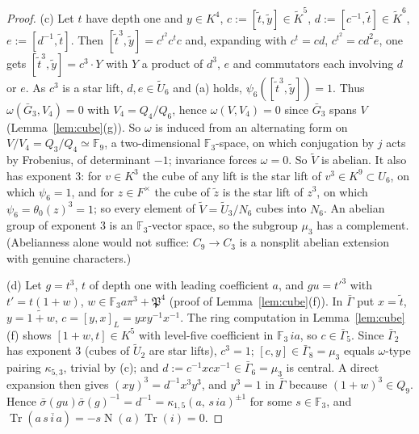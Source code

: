 \documentclass[11pt]{article}
\newcommand{\Fq}{\mathbb F}
\newcommand{\Nm}{\operatorname N}
\newcommand{\Tr}{\operatorname{Tr}}
\newcommand{\tU}{\widetilde U}
\newcommand{\tV}{\widetilde V}
\newcommand{\Pfr}{\mathfrak P}
\theoremstyle{plain}
\theoremstyle{definition}
\begin{document}
\begin{proof}
(c) Let $t$ have depth one and $y\in K^4$, $c:=[\tilde t,\tilde y]\in\tilde K^5$,
$d:=[c^{-1},\tilde t]\in\tilde K^6$, $e:=[d^{-1},\tilde t]$.  Then
$[\tilde t^3,\tilde y]=c^{t^2}c^{t}c$ and, expanding with $c^t=cd$,
$c^{t^2}=cd^2e$, one gets $[\tilde t^3,\tilde y]=c^3\cdot Y$ with $Y$ a
product of $d^3$, $e$ and commutators each involving $d$ or $e$.  As
$c^3$ is a star lift, $d,e\in\tU_6$ and (a) holds, $\psi_6([\tilde t^3,\tilde y])=1$.
Thus $\omega(\bar G_3,V_4)=0$ with $V_4=Q_4/Q_6$, hence $\omega(V,V_4)=0$
since $\bar G_3$ spans $V$ (Lemma~\ref{lem:cube}(g)).  So $\omega$ is
induced from an alternating form on $V/V_4=Q_3/Q_4\simeq\Fq_9$, a
two-dimensional $\Fq_3$-space, on which conjugation by $j$ acts by
Frobenius, of determinant $-1$; invariance forces $\omega=0$.  So $\tV$
is abelian.  It also has exponent $3$: for $v\in K^3$ the cube of any
lift is the star lift of $v^3\in K^9\subset U_6$, on which $\psi_6=1$,
and for $z\in F^\times$ the cube of $\tilde z$ is the star lift of
$z^3$, on which $\psi_6=\theta_0(z)^3=1$; so every element of
$\tV=\tU_3/N_6$ cubes into $N_6$.  An abelian group of exponent $3$ is
an $\Fq_3$-vector space, so the subgroup $\mu_3$ has a complement.
(Abelianness alone would not suffice: $C_9\to C_3$ is a nonsplit abelian
extension with genuine characters.)

(d) Let $g=t^3$, $t$ of depth one with leading coefficient $a$, and
$gu=t'^3$ with $t'=t(1+w)$, $w\in\Fq_3a\pi^3+\Pfr^4$
(proof of Lemma~\ref{lem:cube}(f)).  In $\bar\Gamma$ put $x=\tilde t$,
$y=\widetilde{1+w}$, $c=[y,x]_L=yxy^{-1}x^{-1}$.  The ring computation
in Lemma~\ref{lem:cube}(f) shows $[1+w,t]\in K^5$ with level-five
coefficient in $\Fq_3\,ia$, so $c\in\bar\Gamma_5$.  Since $\bar\Gamma_2$
has exponent $3$ (cubes of $\tU_2$ are star lifts), $c^3=1$;
$[c,y]\in\bar\Gamma_8=\mu_3$ equals $\omega$-type pairing $\kappa_{5,3}$,
trivial by (c); and $d:=c^{-1}xcx^{-1}\in\bar\Gamma_6=\mu_3$ is central.
A direct expansion then gives $(xy)^3=d^{-1}x^3y^3$, and $y^3=1$ in
$\bar\Gamma$ because $(1+w)^3\in Q_9$.  Hence
$\bar\sigma(gu)\bar\sigma(g)^{-1}=d^{-1}=\kappa_{1,5}(a,\,s\,ia)^{\pm1}$
for some $s\in\Fq_3$, and $\Tr(a\,\overline{s\,i\,a})=-s\Nm(a)\Tr(i)=0$.
\end{proof}
\end{document}
